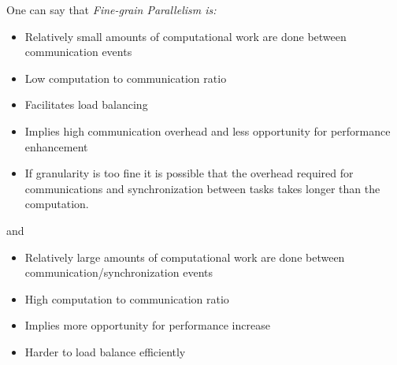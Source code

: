 One can say that \emph{Fine-grain Parallelism is:}
\begin{itemize}
  \item Relatively small amounts of computational work are done between communication events

  \item Low computation to communication ratio

  \item Facilitates load balancing

  \item Implies high communication overhead and less opportunity for performance enhancement

  \item If granularity is too fine it is possible that the overhead required for communications and synchronization between tasks takes longer than the computation.
\end{itemize}
and 
\begin{itemize}
  \item Relatively large amounts of computational work are done between communication/synchronization events

  \item High computation to communication ratio

  \item Implies more opportunity for performance increase

  \item Harder to load balance efficiently
\end{itemize}
